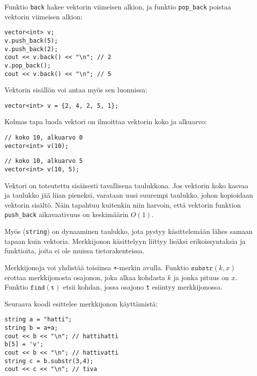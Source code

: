 Funktio \texttt{back} hakee vektorin viimeisen alkion,
ja funktio \texttt{pop\_back} poistaa vektorin
viimeisen alkion:

\begin{lstlisting}
vector<int> v;
v.push_back(5);
v.push_back(2);
cout << v.back() << "\n"; // 2
v.pop_back();
cout << v.back() << "\n"; // 5
\end{lstlisting}

Vektorin sisällön voi antaa myös sen luonnissa:

\begin{lstlisting}
vector<int> v = {2, 4, 2, 5, 1};
\end{lstlisting}

Kolmas tapa luoda vektori on ilmoittaa
vektorin koko ja alkuarvo:

\begin{lstlisting}
// koko 10, alkuarvo 0
vector<int> v(10);
\end{lstlisting}
\begin{lstlisting}
// koko 10, alkuarvo 5
vector<int> v(10, 5);
\end{lstlisting}

Vektori on toteutettu sisäisesti tavallisena taulukkona.
Jos vektorin koko kasvaa ja taulukko jää liian pieneksi,
varataan uusi suurempi taulukko, johon kopioidaan
vektorin sisältö.
Näin tapahtuu kuitenkin niin harvoin, että vektorin
funktion \texttt{push\_back} aikavaativuus on
keskimäärin $O(1)$.


Myös  (\texttt{string}) on dynaaminen taulukko,
jota pystyy käsittelemään lähes samaan
tapaan kuin vektoria.
Merkkijonon käsittelyyn liittyy lisäksi erikoissyntaksia
ja funktioita, joita ei ole muissa tietorakenteissa.

Merkkijonoja voi yhdistää toisiinsa \texttt{+}-merkin avulla.
Funktio $\texttt{substr}(k,x)$ erottaa merkkijonosta
osajonon, joka alkaa kohdasta $k$ ja jonka pituus on $x$.
Funktio $\texttt{find}(\texttt{t})$ etsii kohdan,
jossa osajono \texttt{t} esiintyy merkkijonossa.

Seuraava koodi esittelee merkkijonon käyttämistä:

\begin{lstlisting}
string a = "hatti";
string b = a+a;
cout << b << "\n"; // hattihatti
b[5] = 'v';
cout << b << "\n"; // hattivatti
string c = b.substr(3,4);
cout << c << "\n"; // tiva
\end{lstlisting}

